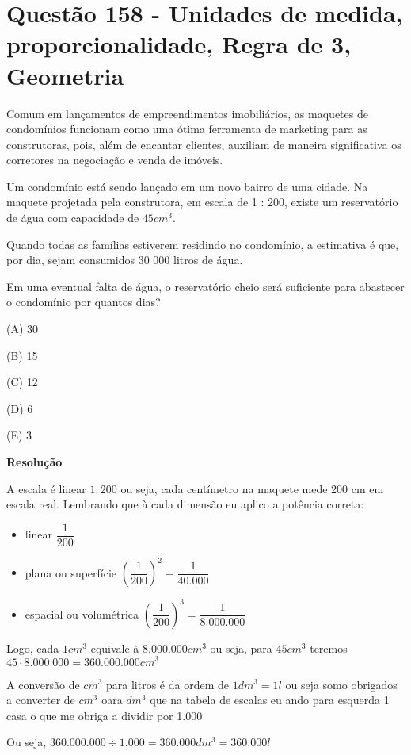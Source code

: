 \section{Questão 158 - Unidades de medida, proporcionalidade, Regra de 3, Geometria}

Comum em lançamentos de empreendimentos imobiliários, as maquetes de condomínios funcionam como uma ótima ferramenta de marketing para as construtoras, pois, além de encantar clientes, auxiliam de maneira significativa os corretores na negociação e venda de imóveis.

Um condomínio está sendo lançado em um novo bairro de uma cidade. Na maquete projetada pela construtora, em escala de 1 : 200, existe um reservatório de água com capacidade de $ 45 cm^3 $.

Quando todas as famílias estiverem residindo no condomínio, a estimativa é que, por dia, sejam consumidos 30 000 litros de água. 

Em uma eventual falta de água, o reservatório cheio será suficiente para abastecer o condomínio por quantos dias?

(A)  30

(B)  15

(C)  12

(D)  6

(E)  3


\textbf{Resolução}

A escala é linear $ 1:200 $  ou seja, cada centímetro na maquete mede 200 cm em escala real.
Lembrando que à cada dimensão eu aplico a potência correta:
\begin{itemize}
    \item linear $ \dfrac{1}{200} $
    \item plana ou superfície $ \left( \dfrac{1}{200} \right)^{2} = \dfrac{1}{40.000}  $
    \item espacial ou volumétrica $ \left( \dfrac{1}{200} \right)^{3} = \dfrac{1}{8.000.000}  $
\end{itemize}

Logo, cada $ 1 cm^3 $ equivale à $ 8.000.000 cm^3 $ ou seja, para $ 45 cm^{3}  $ teremos $ 45 \cdot 8.000.000 = 360.000.000 cm^3 $

A conversão de $ cm^3 $ para litros é da ordem de $ 1 dm^3 = 1 l $ ou seja somo obrigados a converter de $ cm^3 $ oara $ dm^3 $ que na tabela de escalas eu ando para esquerda 1 casa o que me obriga a dividir por 1.000

Ou seja, $ 360.000.000 \div 1.000 = 360.000 dm^3 = 360.000 l $


